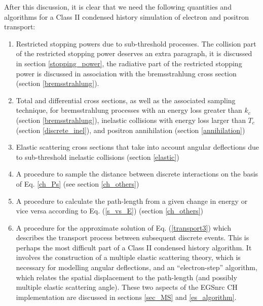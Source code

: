 After this discussion, it is clear that we need the following 
quantities and algorithms for a Class II condensed 
history simulation of electron and positron transport:
\begin{enumerate}
\item
{}
Restricted stopping powers due to sub-threshold processes. 
The collision part of the restricted stopping power deserves 
an extra paragraph, it is discussed in section \ref{stopping_power}, the 
radiative part of the restricted stopping power is 
discussed in association with the bremsstrahlung cross section 
(section \ref{bremsstrahlung}). 
\item
{}
Total and differential cross sections, as well as 
the associated sampling technique, for bremsstrahlung 
processes with an energy loss greater than $k_c$ 
(section \ref{bremsstrahlung}), 
inelastic collisions with energy loss larger than $T_c$ 
(section \ref{discrete_inel}), and positron annihilation 
(section \ref{annihilation})
\item
{}
Elastic scattering cross sections that take into account 
angular deflections due to sub-threshold inelastic 
collisions (section \ref{elastic})
\item
{}
A procedure to sample the distance between discrete 
interactions on the basis of Eq. \eqref{ch_Ps} 
(see section \ref{ch_others})
\item
{}
A procedure to calculate the path-length from a given 
change in energy or vice versa according to 
Eq. (\ref{s_vs_E}) (section \ref{ch_others})
\item
{}
A procedure for the approximate solution of 
Eq. (\ref{transport3}) which describes the 
transport process between subsequent discrete events. 
This is perhaps the most difficult part of a 
Class II  condensed history algorithm.  It 
involves the construction of a multiple elastic scattering 
theory, which is necessary for modelling angular deflections, 
and an ``electron-step'' algorithm, which relates the 
spatial displacement to the path-length (and possibly 
multiple elastic scattering angle). These two aspects 
of the EGSnrc CH implementation are discussed 
in sections \ref{sec_MS} and \ref{es_algorithm}.
\end{enumerate}


